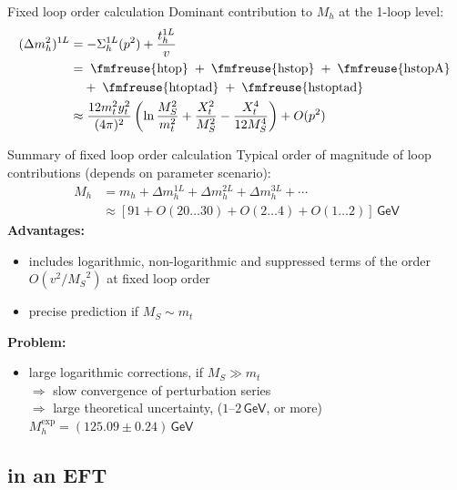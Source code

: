 \documentclass[hyperref={pdfpagelabels=false},ngerman]{beamer}
\newcommand{\fmfvcenter}[1]{\;\vcenter{\hbox{\fmfreuse{#1}}}\;}
\newcommand{\eh}[1]{\,\mathsf{#1}}
\newcommand{\MS}{\ensuremath{M_S}}
\renewcommand{\emph}{\textbf}
\begin{document}
\begin{frame}{Fixed loop order calculation}
  Dominant contribution to $M_h$ at the 1-loop level:
  \begin{align*}
    (\Delta m_h^2)^{1L} &= -\Sigma_h^{1L}(p^2) + \frac{t_h^{1L}}{v} \\
    &= \fmfvcenter{htop} + \fmfvcenter{hstop} + \fmfvcenter{hstopA} \\
    &\phantom{={}} + \fmfvcenter{htoptad} + \fmfvcenter{hstoptad} \\
    &\approx \frac{12 m_t^2 y_t^2}{(4\pi)^2} \left(
      \ln\frac{\MS^2}{m_t^2}
      + \frac{X_t^2}{\MS^2}
      - \frac{X_t^4}{12 \MS^4}
    \right) + O(p^2)
  \end{align*}
\end{frame}

\begin{frame}{Summary of fixed loop order calculation}
  Typical order of magnitude of loop contributions (depends on
  parameter scenario):
  \begin{align*}
    M_h &= m_h + \Delta m_h^{1L} + \Delta m_h^{2L} + \Delta m_h^{3L} + \cdots \\
    &\approx [91 + O(20\ldots 30) + O(2\ldots 4) + O(1\ldots 2)] \eh{GeV}
  \end{align*}
  \emph{Advantages:}
  \begin{itemize}
  \item includes logarithmic, non-logarithmic and suppressed terms of
    the order $O(v^2/\MS^2)$ at fixed loop order
  \item precise prediction if $\MS \sim m_t$
  \end{itemize}
  \emph{Problem:}
  \begin{itemize}
  \item large logarithmic corrections, if $\MS \gg m_t$ \\
    $\Rightarrow$ slow convergence of perturbation series \\
    $\Rightarrow$ large theoretical uncertainty, ($1$--$2\eh{GeV}$, or
    more) \\
    $M_h^{\text{exp}} = (125.09 \pm 0.24)\eh{GeV}$
  \end{itemize}
\end{frame}


\subsection{in an EFT}
\end{document}
